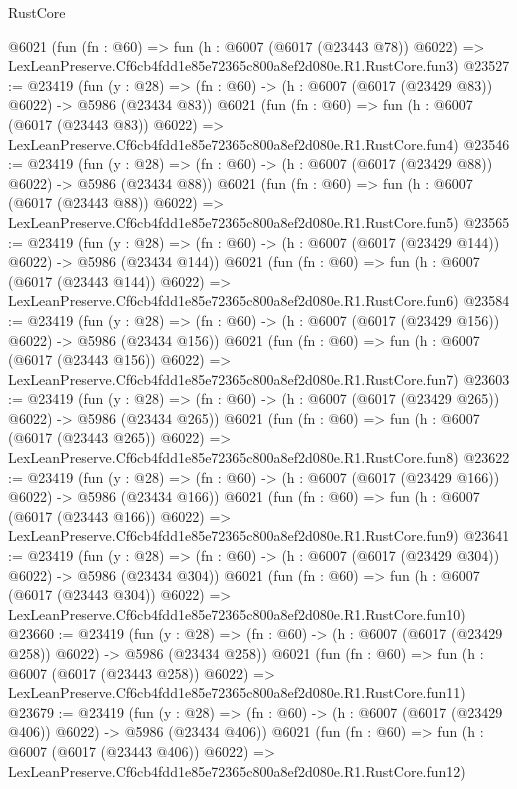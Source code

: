\begin{lexlean}{RustCore}
\begin{coremodule}
    @6021
    (fun (fn : @60) =>
    fun (h : @6007 (@6017 (@23443 @78)) @6022) =>
    LexLeanPreserve.Cf6cb4fdd1e85e72365c800a8ef2d080e.R1.RustCore.fun3)
@23527 := @23419
    (fun (y : @28) => (fn : @60) -> (h : @6007 (@6017 (@23429 @83)) @6022) -> @5986 (@23434 @83))
    @6021
    (fun (fn : @60) =>
    fun (h : @6007 (@6017 (@23443 @83)) @6022) =>
    LexLeanPreserve.Cf6cb4fdd1e85e72365c800a8ef2d080e.R1.RustCore.fun4)
@23546 := @23419
    (fun (y : @28) => (fn : @60) -> (h : @6007 (@6017 (@23429 @88)) @6022) -> @5986 (@23434 @88))
    @6021
    (fun (fn : @60) =>
    fun (h : @6007 (@6017 (@23443 @88)) @6022) =>
    LexLeanPreserve.Cf6cb4fdd1e85e72365c800a8ef2d080e.R1.RustCore.fun5)
@23565 := @23419
    (fun (y : @28) => (fn : @60) -> (h : @6007 (@6017 (@23429 @144)) @6022) -> @5986 (@23434 @144))
    @6021
    (fun (fn : @60) =>
    fun (h : @6007 (@6017 (@23443 @144)) @6022) =>
    LexLeanPreserve.Cf6cb4fdd1e85e72365c800a8ef2d080e.R1.RustCore.fun6)
@23584 := @23419
    (fun (y : @28) => (fn : @60) -> (h : @6007 (@6017 (@23429 @156)) @6022) -> @5986 (@23434 @156))
    @6021
    (fun (fn : @60) =>
    fun (h : @6007 (@6017 (@23443 @156)) @6022) =>
    LexLeanPreserve.Cf6cb4fdd1e85e72365c800a8ef2d080e.R1.RustCore.fun7)
@23603 := @23419
    (fun (y : @28) => (fn : @60) -> (h : @6007 (@6017 (@23429 @265)) @6022) -> @5986 (@23434 @265))
    @6021
    (fun (fn : @60) =>
    fun (h : @6007 (@6017 (@23443 @265)) @6022) =>
    LexLeanPreserve.Cf6cb4fdd1e85e72365c800a8ef2d080e.R1.RustCore.fun8)
@23622 := @23419
    (fun (y : @28) => (fn : @60) -> (h : @6007 (@6017 (@23429 @166)) @6022) -> @5986 (@23434 @166))
    @6021
    (fun (fn : @60) =>
    fun (h : @6007 (@6017 (@23443 @166)) @6022) =>
    LexLeanPreserve.Cf6cb4fdd1e85e72365c800a8ef2d080e.R1.RustCore.fun9)
@23641 := @23419
    (fun (y : @28) => (fn : @60) -> (h : @6007 (@6017 (@23429 @304)) @6022) -> @5986 (@23434 @304))
    @6021
    (fun (fn : @60) =>
    fun (h : @6007 (@6017 (@23443 @304)) @6022) =>
    LexLeanPreserve.Cf6cb4fdd1e85e72365c800a8ef2d080e.R1.RustCore.fun10)
@23660 := @23419
    (fun (y : @28) => (fn : @60) -> (h : @6007 (@6017 (@23429 @258)) @6022) -> @5986 (@23434 @258))
    @6021
    (fun (fn : @60) =>
    fun (h : @6007 (@6017 (@23443 @258)) @6022) =>
    LexLeanPreserve.Cf6cb4fdd1e85e72365c800a8ef2d080e.R1.RustCore.fun11)
@23679 := @23419
    (fun (y : @28) => (fn : @60) -> (h : @6007 (@6017 (@23429 @406)) @6022) -> @5986 (@23434 @406))
    @6021
    (fun (fn : @60) =>
    fun (h : @6007 (@6017 (@23443 @406)) @6022) =>
    LexLeanPreserve.Cf6cb4fdd1e85e72365c800a8ef2d080e.R1.RustCore.fun12)

\end{coremodule}
\end{lexlean}
